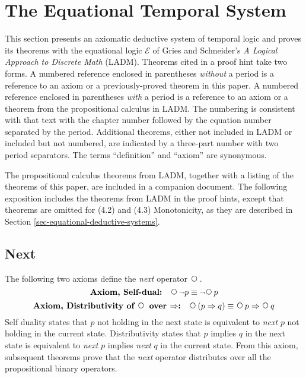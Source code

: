 \documentclass[12pt, fleqn, leqno]{article}
\newcommand{\impl}{\ensuremath{\Rightarrow}}        %
\newcommand{\Next}{\;\,\text{\raisebox{3.5pt}{\circle{6}}}}
\begin{document}
\section{The Equational Temporal System}

This section presents an axiomatic deductive system of temporal logic and proves its theorems with the equational
logic $\mathcal{E}$ of Gries and Schneider's \textit{A Logical Approach to Discrete Math} (LADM). \cite{LADM}
Theorems cited in a proof hint take two forms.
A numbered reference enclosed in parentheses \textit{without} a period is a reference to an axiom or a previously-proved
theorem in this paper.
A numbered reference enclosed in parentheses \textit{with} a period is a reference to an axiom or a
theorem from the propositional calculus in LADM.
The numbering is consistent with that text with the chapter number followed by the equation number separated by the period.
Additional theorems, either not included in LADM or included but not numbered, are indicated by a three-part number with two period separators.
The terms ``definition'' and ``axiom'' are synonymous.

The propositional calculus theorems from LADM, together with a listing of the theorems of this paper, are included in a companion document. \cite{vegaTheorems}
The following exposition includes the theorems from LADM in the proof hints, except that theorems are omitted for (4.2) and (4.3) Monotonicity, as they are described in Section \ref{sec-equational-deductive-systems}.

\subsection{Next}\label{section-next}

The following two axioms define the \textit{next} operator $\Next$.
\begin{equation}\label{E:selfDual}
\textbf{Axiom, Self-dual:}\quad \Next\neg p \equiv \neg\Next p
\end{equation}
\begin{equation}\label{E:distNextImp}
\textbf{Axiom, Distributivity of $\Next$ over $\impl$:}\quad \Next (p \impl q) \equiv \Next p \impl \Next q
\end{equation}
Self duality states that $p$ not holding in the next state is equivalent to \textit{next} $p$ not holding in the current state.
Distributivity states that $p$ implies $q$ in the next state is equivalent to \textit{next} $p$ implies \textit{next} $q$ in the current state.
From this axiom, subsequent theorems prove that the \textit{next} operator distributes over all the propositional binary operators.
\end{document}
